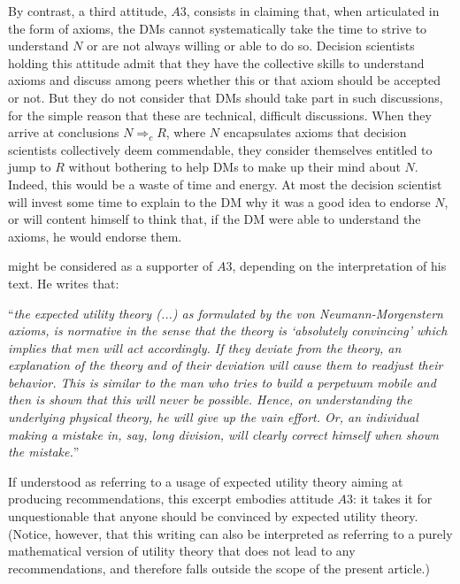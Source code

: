 \documentclass[preprint, french, english, 11pt, authoryear]{elsarticle}%
\begin{document}
By contrast, a third attitude, $A3$, consists in claiming that, when articulated in the form of axioms, the \acp{DM} cannot systematically take the time to strive to understand $N$ or are not always willing or able to do so. Decision scientists holding this attitude admit that they have the collective skills to understand axioms and discuss among peers whether this or that axiom should be accepted or not. But they do not consider that \acp{DM} should take part in such discussions, for the simple reason that these are technical, difficult discussions. When they arrive at conclusions $N ⇒_c R$, where $N$ encapsulates axioms that decision scientists collectively deem commendable, they consider themselves entitled to jump to $R$ without bothering to help \acp{DM} to make up their mind about $N$. Indeed, this would be a waste of time and energy. At most the decision scientist will invest some time to explain to the \ac{DM} why it was a good idea to endorse $N$, or will content himself to think that, if the \ac{DM} were able to understand the axioms, he would endorse them.

\citet[p. 180]{morgenstern_reflections_1979} might be considered as a supporter of $A3$, depending on the interpretation of his text. He writes that: 

\begin{addmargin}[3em]{3em}
“\emph{the expected utility theory (...) as formulated by the von Neumann-Morgenstern axioms, is normative in the sense that the theory is ‘absolutely convincing’ which implies that men will act accordingly. If they deviate from the theory, an explanation of the theory and of their deviation will cause them to readjust their behavior. This is similar to the man who tries to build a perpetuum mobile and then is shown that this will never be possible. Hence, on understanding the underlying physical theory, he will give up the vain effort. Or, an individual making a mistake in, say, long division, will clearly correct himself when shown the mistake.}” 
\end{addmargin}
If understood as referring to a usage of expected utility theory aiming at producing recommendations, this excerpt embodies attitude $A3$: it takes it for unquestionable that anyone should be convinced by expected utility theory. (Notice, however, that this writing can also be interpreted as referring to a purely mathematical version of utility theory that does not lead to any recommendations, and therefore falls outside the scope of the present article.)
\end{document}
